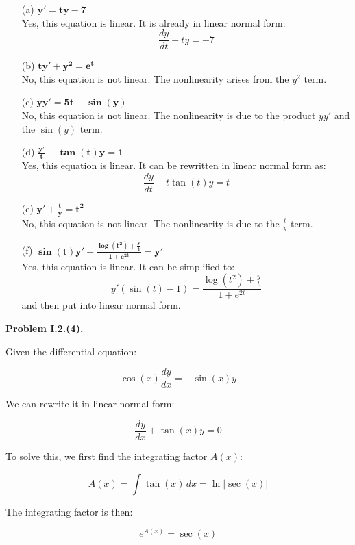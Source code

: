 \documentclass{article}
\begin{document}
\begin{enumerate}
    \item[(a)] \(\mathbf{y' = t y - 7}\) \\
    Yes, this equation is linear. It is already in linear normal form:
    \[
    \frac{dy}{dt} - t y = -7
    \]

    \item[(b)] \(\mathbf{t y' + y^2 = e^t}\) \\
    No, this equation is not linear. The nonlinearity arises from the \(y^2\) term.

    \item[(c)] \(\mathbf{y y' = 5t - \sin(y)}\) \\
    No, this equation is not linear. The nonlinearity is due to the product \(y y'\) and the \(\sin(y)\) term.

    \item[(d)] \(\mathbf{\frac{y'}{t} + \tan(t) y = 1}\) \\
    Yes, this equation is linear. It can be rewritten in linear normal form as:
    \[
    \frac{dy}{dt} + t \tan(t) y = t
    \]

    \item[(e)] \(\mathbf{y' + \frac{t}{y} = t^2}\) \\
    No, this equation is not linear. The nonlinearity is due to the \(\frac{t}{y}\) term.

    \item[(f)] \(\mathbf{\sin(t) y' - \frac{\log(t^2) + \frac{y}{t}}{1 + e^{2t}} = y'}\) \\
    Yes, this equation is linear. It can be simplified to:
    \[
    y' \left(\sin(t) - 1\right) = \frac{\log(t^2) + \frac{y}{t}}{1 + e^{2t}}
    \]
    and then put into linear normal form.
\end{enumerate}



\textbf{Problem I.2.(4).}

Given the differential equation:

\[
\cos(x) \frac{dy}{dx} = -\sin(x) y
\]

We can rewrite it in linear normal form:

\[
\frac{dy}{dx} + \tan(x) y = 0
\]

To solve this, we first find the integrating factor \(A(x)\):

\[
A(x) = \int \tan(x) \, dx = \ln|\sec(x)|
\]

The integrating factor is then:

\[
e^{A(x)} = \sec(x)
\]
\end{document}
